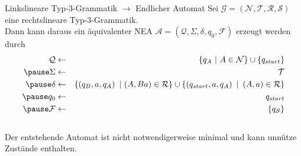 \documentclass[]{beamer}
\begin{document}
\begin{frame}[squeeze]{}
  \begin{block}{Linkslineare Typ-3-Grammatik $\to$ Endlicher Automat}
    Sei $\mathcal{G} = \left( \mathcal{N}, \mathcal{T}, \mathcal{R}, \mathcal{S} \right)$ eine rechtslineare Typ-3-Grammatik. \\
    \vspace*{0.5em}
    Dann kann daraus ein äquivalenter NEA $\mathcal{A} = \left( \mathcal{Q}, \Sigma, \delta, q_0, \mathcal{F} \right)$ erzeugt werden durch
    \pause
    \begin{eqnarray*}
      \mathcal{Q} & \leftarrow & \left\{ q_A \ | \ A \in \mathcal{N} \right\} \cup \left\{ q_{start} \right\} \\
      \pause
      \Sigma & \leftarrow & \mathcal{T} \\
      \pause
      \delta & \leftarrow & \left\{\left( q_B, a, q_A \right) \ | \ ( A, Ba ) \in \mathcal{R} \right\} \cup \left\{ \left(q_{start}, a, q_A \right) \ | \ \left(A, a \right) \in \mathcal{R} \right\} \\
      \pause
      q_0 & \leftarrow & q_{start} \\
      \pause
      \mathcal{F} & \leftarrow & \left\{ q_\mathcal{S} \right\} \\
    \end{eqnarray*}
    \\
    \vspace*{-1em}
    Der entstehende Automat ist nicht notwendigerweise minimal und kann unnütze Zustände enthalten.
  \end{block}
\end{frame}
\end{document}
